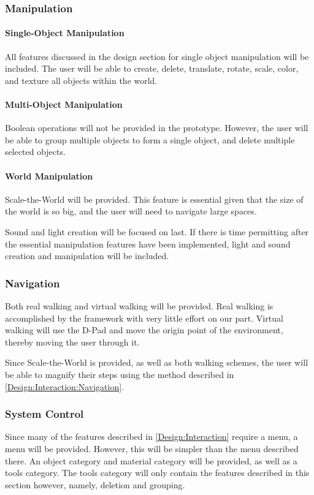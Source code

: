 \subsubsection{Manipulation}
\paragraph{Single-Object Manipulation}
All features discussed in the design section for single object manipulation will be included.
The user will be able to create, delete, translate, rotate, scale, color, and texture all objects within the world.

\paragraph{Multi-Object Manipulation}
Boolean operations will not be provided in the prototype.
However, the user will be able to group multiple objects to form a single object, and delete multiple selected objects.

\paragraph{World Manipulation}
Scale-the-World will be provided.
This feature is essential given that the size of the world is so big, and the user will need to navigate large spaces.

Sound and light creation will be focused on last.
If there is time permitting after the essential manipulation features have been implemented, light and sound creation and manipulation will be included.

\subsubsection{Navigation}
Both real walking and virtual walking will be provided.
Real walking is accomplished by the framework with very little effort on our part.
Virtual walking will use the D-Pad and move the origin point of the environment, thereby moving the user through it.

Since Scale-the-World is provided, as well as both walking schemes, the user will be able to magnify their steps using the method described in \ref{Design:Interaction:Navigation}.

\subsubsection{System Control}
Since many of the features described in \ref{Design:Interaction} require a menu, a menu will be provided.
However, this will be simpler than the menu described there.
An object category and material category will be provided, as well as a tools category.
The tools category will only contain the features described in this section however, namely, deletion and grouping.

